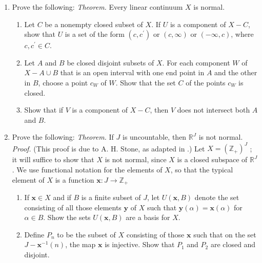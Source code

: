 \begin{enumerate}[itemsep=0.4em, parsep=0pt, topsep=0pt, partopsep=0pt, leftmargin=*, label=\arabic*., ref=\arabic*]
\begin{enumerate}[itemsep=0.2em, parsep=0pt, topsep=0pt, partopsep=0pt, leftmargin=*, label=(\alph*), align=left]
 \end{enumerate}
\item[*8.] Prove the following: \textsl{Theorem.} Every linear continuum \(X\) is normal.
  \begin{enumerate}[itemsep=0.2em, parsep=0pt, topsep=0pt, partopsep=0pt, leftmargin=*, label=(\alph*), align=left]
  \item Let \(C\) be a nonempty closed subset of \(X\). If \(U\) is a component of \(X - C\), show that \(U\) is a set of the form \(( {c,c^{\prime }})\) or \(( {c,\infty })\) or \(( {-\infty, c})\), where \(c,c^{\prime } \in C\).
  \item Let \(A\) and \(B\) be closed disjoint subsets of \(X\). For each component \(W\) of \(X - A \cup B\) that is an open interval with one end point in \(A\) and the other in \(B\), choose a point \(c_{W}\) of \(W\). Show that the set \(C\) of the points \(c_{W}\) is closed.
  \item Show that if \(V\) is a component of \(X - C\), then \(V\) does not intersect both \(A\) and \(B\).
  \end{enumerate}
\addtocounter{enumi}{1}%
\item[*9.] Prove the following: \textsl{Theorem.} If \(J\) is uncountable, then \(\mathbb{R}^{J}\) is not normal. \textsl{Proof.} (This proof is due to A. H. Stone, as adapted in \cite{SteenSeebach1970}.) Let \(X = {( \mathbb{Z}_{ + }) }^{J}\) ; it will suffice to show that \(X\) is not normal, since \(X\) is a closed subspace of \(\mathbb{R}^{J}\). We use functional notation for the elements of \(X\), so that the typical element of \(X\) is a function \(\mathbf{x} : J \rightarrow {\mathbb{Z}}_{ + }\)
 \begin{enumerate}[itemsep=0.2em, parsep=0pt, topsep=0pt, partopsep=0pt, leftmargin=*, label=(\alph*), align=left]
 \item If \(\mathbf{x} \in X\) and if \(B\) is a finite subset of \(J\), let \(U( {\mathbf{x},B})\) denote the set consisting of all those elements \(\mathbf{y}\) of \(X\) such that \(\mathbf{y}( \alpha ) = \mathbf{x}( \alpha )\) for \(\alpha \in B\). Show the sets \(U( {\mathbf{x},B})\) are a basis for \(X\).
 \item Define \(P_{n}\) to be the subset of \(X\) consisting of those \(\mathbf{x}\) such that on the set \(J - \mathbf{x}^{-1}(n)\), the map \(\mathbf{x}\) is injective. Show that \(P_{1}\) and \(P_{2}\) are closed and disjoint.

\end{enumerate}
\end{enumerate}
